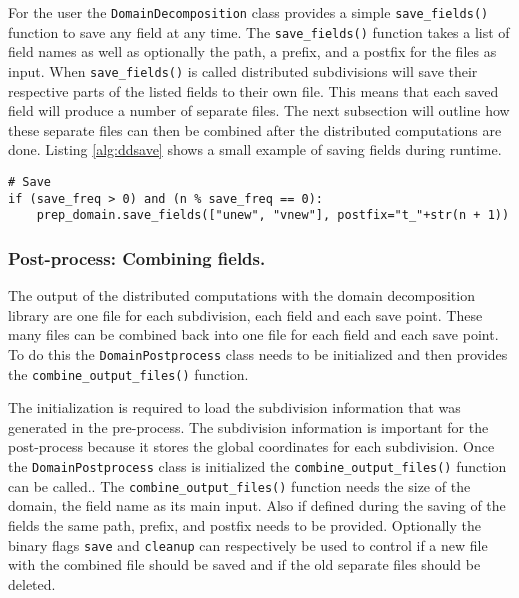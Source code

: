 For the user the \texttt{DomainDecomposition} class provides a simple \texttt{save\_fields()} function to save any field at any time.
The \texttt{save\_fields()} function takes a list of field names as well as optionally the path, a prefix, and a postfix for the files as input.
When \texttt{save\_fields()} is called distributed subdivisions will save their respective parts of the listed fields to their own file.
This means that each saved field will produce a number of separate files.
The next subsection will outline how these separate files can then be combined after the distributed computations are done.
Listing \ref{alg:ddsave} shows a small example of saving fields during runtime.

\begin{lstlisting}[caption={Example calling to save two fields during time stepping using the domain decomposition libarary},captionpos=b, label={alg:ddsave}, float, floatplacement=H]
# Save
if (save_freq > 0) and (n % save_freq == 0):
    prep_domain.save_fields(["unew", "vnew"], postfix="t_"+str(n + 1))
\end{lstlisting}

\subsubsection{Post-process: Combining fields.}
The output of the distributed computations with the domain decomposition library are one file for each subdivision, each field and each save point.
These many files can be combined back into one file for each field and each save point.
To do this the \texttt{DomainPostprocess} class needs to be initialized and then provides the \texttt{combine\_output\_files()} function.

The initialization is required to load the subdivision information that was generated in the pre-process.
The subdivision information is important for the post-process because it stores the global coordinates for each subdivision.
Once the \texttt{DomainPostprocess} class is initialized the \texttt{combine\_output\_files()} function can be called..
The \texttt{combine\_output\_files()} function needs the size of the domain, the field name as its main input.
Also if defined during the saving of the fields the same path, prefix, and postfix needs to be provided.
Optionally the binary flags \texttt{save} and \texttt{cleanup} can respectively be used to control if a new file with the combined file should be saved and if the old separate files should be deleted.

